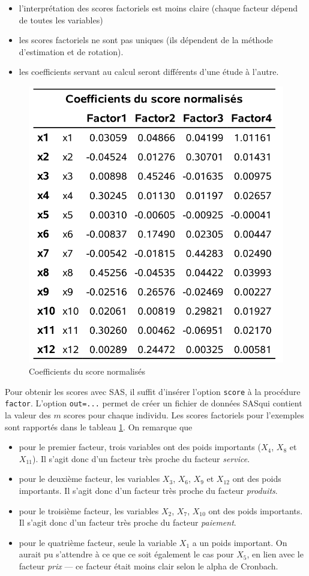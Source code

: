 \documentclass[
]{book}
\providecommand{\tightlist}{%
  \setlength{\itemsep}{0pt}\setlength{\parskip}{0pt}}
\theoremstyle{definition}
\theoremstyle{definition}
\theoremstyle{definition}
\theoremstyle{remark}
\begin{document}
\begin{itemize}
\tightlist
\item
  l'interprétation des scores factoriels est moins claire (chaque facteur dépend de toutes les variables)
\item
  les scores factoriels ne sont pas uniques (ils dépendent de la méthode d'estimation et de rotation).
\item
  les coefficients servant au calcul seront différents d'une étude à l'autre.
\end{itemize}

\begin{figure}

{\centering \includegraphics[width=0.6\linewidth]{figures/01-facto-e15} 

}

\caption{Coefficients du score normalisés}\label{fig:fig1p15}
\end{figure}

Pour obtenir les scores avec \textsf{SAS}, il suffit d'insérer l'option \texttt{score} à la procédure \texttt{factor}. L'option \texttt{out=...} permet de créer un fichier de données \textsf{SAS}qui contient la valeur des \(m\) scores pour chaque individu.
Les scores factoriels pour l'exemples sont rapportés dans le tableau \ref{fig:fig1p15}. On remarque que

\begin{itemize}
\tightlist
\item
  pour le premier facteur, trois variables ont des poids importants (\(X_4\), \(X_8\) et \(X_{11}\)). Il s'agit donc d'un facteur très proche du facteur \emph{service}.
\item
  pour le deuxième facteur, les variables \(X_3\), \(X_6\), \(X_9\) et \(X_{12}\) ont des poids importants. Il s'agit donc d'un facteur très proche du facteur \emph{produits}.
\item
  pour le troisième facteur, les variables \(X_2\), \(X_7\), \(X_{10}\) ont des poids importants. Il s'agit donc d'un facteur très proche du facteur \emph{paiement}.
\item
  pour le quatrième facteur, seule la variable \(X_1\) a un poids important.
  On aurait pu s'attendre à ce que ce soit également le cas pour \(X_5\), en lien avec le facteur \emph{prix} --- ce facteur était moins clair selon le alpha de Cronbach.
\end{itemize}
\end{document}

